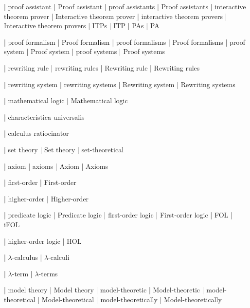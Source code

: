 

 | proof assistant
 | Proof assistant
 | proof assistants
 | Proof assistants
 | interactive theorem prover
 | Interactive theorem prover
 | interactive theorem provers
 | Interactive theorem provers
 | ITPs
 | ITP
 | PAs
 | PA

 | proof formalism
 | Proof formalism
 | proof formalisms
 | Proof formalisms
 | proof system
 | Proof system
 | proof systems
 | Proof systems

 | rewriting rule
 | rewriting rules
 | Rewriting rule
 | Rewriting rules

 | rewriting system
 | rewriting systems
 | Rewriting system
 | Rewriting systems

 | mathematical logic
 | Mathematical logic

 | characteristica universalis

 | calculus ratiocinator
 
 | set theory
 | Set theory
 | set-theoretical

 | axiom
 | axioms
 | Axiom
 | Axioms

 | first-order
 | First-order

 | higher-order
 | Higher-order

 | predicate logic
 | Predicate logic
 | first-order logic
 | First-order logic
 | FOL
 | iFOL
 
 | higher-order logic
 | HOL

 | $\lambda$-calculus
 | $\lambda$-calculi
 
 | $\lambda$-term
 | $\lambda$-terms

 | model theory
 | Model theory
 | model-theoretic
 | Model-theoretic
 | model-theoretical
 | Model-theoretical
 | model-theoretically
 | Model-theoretically

